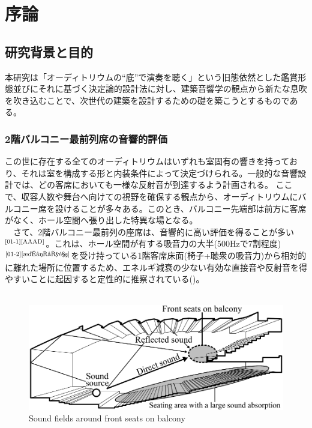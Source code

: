 \chapter{序論}
\thispagestyle{fancy}
\nobreak
\section{研究背景と目的}
本研究は「オーディトリウムの“底”で演奏を聴く」という旧態依然とした鑑賞形態並びにそれに基づく決定論的設計法に対し、建築音響学の観点から新たな息吹を吹き込むことで、次世代の建築を設計するための礎を築こうとするものである。

\subsection{2階バルコニー最前列席の音響的評価}
この世に存在する全てのオーディトリウムはいずれも室固有の響きを持っており、それは室を構成する形と内装条件によって決定づけられる。一般的な音響設計では、どの客席においても一様な反射音が到達するよう計画される。
ここで、収容人数や舞台へ向けての視野を確保する観点から、オーディトリウムにバルコニー席を設けることが多々ある。このとき、バルコニー先端部は前方に客席がなく、ホール空間へ張り出した特異な場となる。
\\　さて、2階バルコニー最前列の座席は、音響的に高い評価を得ることが多い$^{\text{\cite{01-1}{\cite{AAAD}}}}$。これは、ホール空間が有する吸音力の大半(500Hzで7割程度)$^{\text{\cite{01-2}{\cite{椅子吸音}}}}$を受け持っている1階客席床面(椅子+聴衆の吸音力)から相対的に離れた場所に位置するため、エネルギ減衰の少ない有効な直接音や反射音を得やすいことに起因すると定性的に推察されている()。
\\
\\
\begin{figure}[h]
    \centering
    \includegraphics[keepaspectratio,scale=0.8]{01_att/second_balcony.pdf}
    \caption{\hspace{1mm}Sound fields around front seats on balcony}
    \label{fig:2階バルコニー最前列席の音場}
\end{figure}

